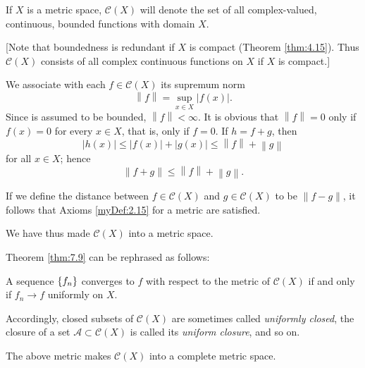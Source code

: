 \begin{myDef}
    \label{myDef:7.14}
    If $X$ is a metric space, $\mathscr{C}(X)$ will denote the set of all complex-valued, continuous, bounded functions with domain $X$.

    [Note that boundedness is redundant if $X$ is compact (Theorem \ref{thm:4.15}). 
    Thus $\mathscr{C}(X)$ consists of all complex continuous functions on $X$ if $X$ is compact.]

    We associate with each $f \in \mathscr{C}(X)$ its supremum norm
    \begin{equation*}
        \left\| f \right\| = \sup_{x \in X} \left| f(x) \right| .
    \end{equation*}
    Since 
    is assumed to be bounded, $\left\| f \right\| < \infty $. 
    It is obvious that $\left\| f \right\| = 0$ only if
    $f(x) = 0$ for every $x \in X$, 
    that is, only if $f = 0$. 
    If $h =f + g$, then
    \begin{equation*}
        \left| h(x) \right| \leq 
        \left| f(x) \right| + \left| g(x) \right| \leq
        \left\| f \right\| + \left\| g \right\| 
    \end{equation*}
    for all $x \in X$; hence
    \begin{equation*}
        \left\| f + g \right\| \leq
        \left\| f \right\| + \left\| g \right\| .
    \end{equation*}

    If we define the distance between $f \in \mathscr{C}(X)$ and $g \in \mathscr{C}(X)$ to be $\left\| f - g \right\| $,
    it follows that Axioms \ref{myDef:2.15} for a metric are satisfied.

    We have thus made $\mathscr{C}(X)$ into a metric space.
    
    Theorem \ref{thm:7.9} can be rephrased as follows:
    
    A sequence $\protect\{f_n\}$ converges to $f$ with respect to the metric of $\mathscr{C}(X)$ if and only if $f_n \rightarrow f$ uniformly on $X$.
    
    Accordingly, closed subsets of $\mathscr{C}(X)$ are sometimes called \emph{uniformly closed}, 
    the closure of a set $\mathscr{A} \subset \mathscr{C}(X)$ is called its \emph{uniform closure}, and so on.
\end{myDef}

\begin{thm}
    \label{thm:7.15}
    The above metric makes $\mathscr{C}(X)$ into a complete metric space.
\end{thm}


